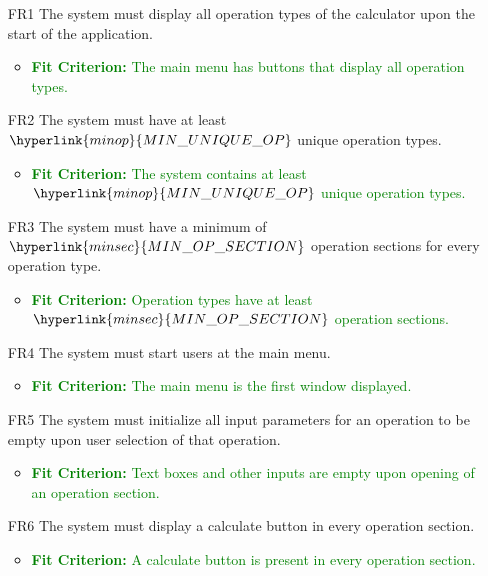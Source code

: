 \documentclass[12pt, titlepage]{article}
\begin{document}
\begin{enumerate}

\item [FR1] The system must display all operation types of the calculator upon the start of the application.
\begin{itemize}
  \item \textcolor{Green}{\textbf{Fit Criterion:} The main menu has buttons that display all operation types.}
\end{itemize}

\item [FR2] The system must have at least $\hyperlink{minop}{MIN\_UNIQUE\_OP}$ unique operation types.
\begin{itemize}
    \item \textcolor{Green}{\textbf{Fit Criterion:} The system contains at least $\hyperlink{minop}{MIN\_UNIQUE\_OP}$ unique operation types.}
\end{itemize}

\item [FR3] The system must have a minimum of $\hyperlink{minsec}{MIN\_OP\_SECTION}$ operation sections for every operation type.
\begin{itemize}
  \item \textcolor{Green}{\textbf{Fit Criterion:} Operation types have at least $\hyperlink{minsec}{MIN\_OP\_SECTION}$ operation sections.}
\end{itemize}

\item [FR4] The system must start users at the main menu.
\begin{itemize}
  \item \textcolor{Green}{\textbf{Fit Criterion:} The main menu is the first window displayed.}
\end{itemize}

\item [FR5] The system must initialize all input parameters for an operation to be empty upon user selection of that operation.
\begin{itemize}
  \item \textcolor{Green}{\textbf{Fit Criterion:} Text boxes and other inputs are empty upon opening of an operation section.}
\end{itemize}

\item [FR6] The system must display a calculate button in every operation section.
\begin{itemize}
  \item \textcolor{Green}{\textbf{Fit Criterion:} A calculate button is present in every operation section.}
\end{itemize}


\end{enumerate}
\end{document}
